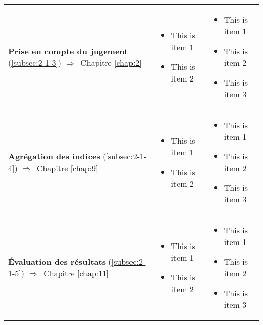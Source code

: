 \begin{tabular}{L{5cm}L{4.5cm}L{4.5cm}}
  \textbf{Prise en compte du jugement} (\ref{subsec:2-1-3}) {\footnotesize $\Longrightarrow$~Chapitre \ref{chap:2}}
& \begin{minipage}{4cm}
    \begin{itemize}
    \item This is item 1
    \item This is item 2
    \end{itemize}
  \end{minipage}& \begin{minipage}{4cm}
    \begin{itemize}
    \item This is item 1
    \item This is item 2
    \item This is item 3
    \end{itemize}
  \end{minipage} \\
  
  \textbf{Agrégation des indices} (\ref{subsec:2-1-4}) {\footnotesize $\Longrightarrow$~Chapitre \ref{chap:9}}
& \begin{minipage}{4cm}
    \begin{itemize}
    \item This is item 1
    \item This is item 2
    \end{itemize}
  \end{minipage}& \begin{minipage}{4cm}
    \begin{itemize}
    \item This is item 1
    \item This is item 2
    \item This is item 3
    \end{itemize}
  \end{minipage} \\
  
  \textbf{Évaluation des résultats} (\ref{subsec:2-1-5})
  {\footnotesize $\Longrightarrow$~Chapitre \ref{chap:11}}
& \begin{minipage}{4cm}
    \begin{itemize}
    \item This is item 1
    \item This is item 2
    \end{itemize}
  \end{minipage}& \begin{minipage}{4cm}
    \begin{itemize}
    \item This is item 1
    \item This is item 2
    \item This is item 3
    \end{itemize}
  \end{minipage}\\
  
  \bottomrule
\end{tabular}
